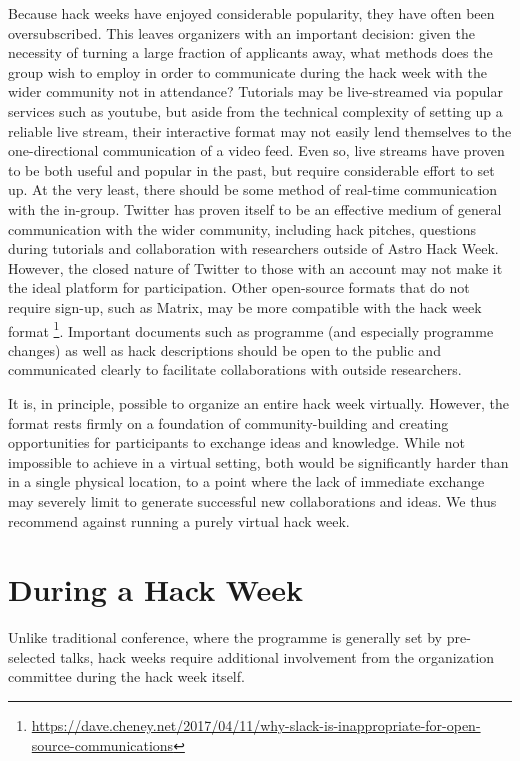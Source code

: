 \documentclass{aastex62}
\begin{document}
Because hack weeks have enjoyed considerable popularity, they have often been oversubscribed. This leaves organizers with an important decision: given the necessity of turning a large fraction of applicants away, what methods does the group wish to employ in order to communicate during the hack week with the wider community not in attendance? Tutorials may be live-streamed via popular services such as youtube, but aside from the technical complexity of setting up a reliable live stream, their interactive format may not easily lend themselves to the one-directional communication of a video feed. Even so, live streams have proven to be both useful and popular in the past, but require considerable effort to set up. At the very least, there should be some method of real-time communication with the in-group. Twitter has proven itself to be an effective medium of general communication with the wider community, including hack pitches, questions during tutorials and collaboration with researchers outside of Astro Hack Week. However, the closed nature of Twitter to those with an account may not make it the ideal platform for participation. Other open-source formats that do not require sign-up, such as Matrix, may be more compatible with the hack week format \footnote{\url{https://dave.cheney.net/2017/04/11/why-slack-is-inappropriate-for-open-source-communications}}. Important documents such as programme (and especially programme changes) as well as hack descriptions should be open to the public and communicated clearly to facilitate collaborations with outside researchers.

It is, in principle, possible to organize an entire hack week virtually. However, the format rests firmly on a foundation of community-building and creating opportunities for participants to exchange ideas and knowledge. While not impossible to achieve in a virtual setting, both would be significantly harder than in a single physical location, to a point where the lack of immediate exchange may severely limit to generate successful new collaborations and ideas. We thus recommend against running a purely virtual hack week.

\section{During a Hack Week}

Unlike traditional conference, where the programme is generally set by pre-selected talks, hack weeks require additional involvement from the organization committee during the hack week itself.
\end{document}

